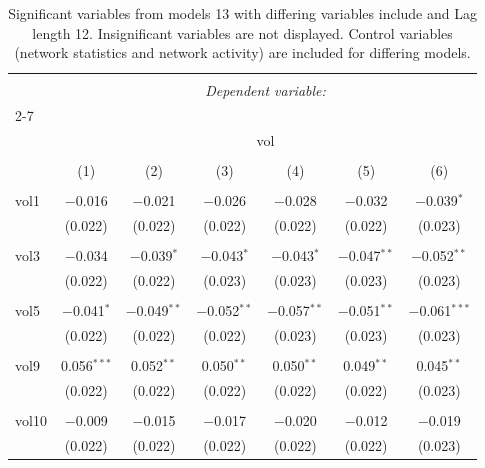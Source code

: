 
\begin{table}[!htbp] \centering 
  \caption{Significant variables from models 13 with differing variables include 
                               and Lag length 12. Insignificant variables are not displayed. 
                               Control variables (network statistics and network activity) are 
                               included for differing models.} 
  \label{Volumemodels1_5min_t} 
\scriptsize 
\begin{tabular}{@{\extracolsep{5pt}}lcccccc} 
\\[-1.8ex]\hline 
\hline \\[-1.8ex] 
 & \multicolumn{6}{c}{\textit{Dependent variable:}} \\ 
\cline{2-7} 
\\[-1.8ex] & \multicolumn{6}{c}{vol} \\ 
\\[-1.8ex] & (1) & (2) & (3) & (4) & (5) & (6)\\ 
\hline \\[-1.8ex] 
 vol1 & $-$0.016 & $-$0.021 & $-$0.026 & $-$0.028 & $-$0.032 & $-$0.039$^{*}$ \\ 
  & (0.022) & (0.022) & (0.022) & (0.022) & (0.022) & (0.023) \\ 
  & & & & & & \\ 
 vol3 & $-$0.034 & $-$0.039$^{*}$ & $-$0.043$^{*}$ & $-$0.043$^{*}$ & $-$0.047$^{**}$ & $-$0.052$^{**}$ \\ 
  & (0.022) & (0.022) & (0.023) & (0.023) & (0.023) & (0.023) \\ 
  & & & & & & \\ 
 vol5 & $-$0.041$^{*}$ & $-$0.049$^{**}$ & $-$0.052$^{**}$ & $-$0.057$^{**}$ & $-$0.051$^{**}$ & $-$0.061$^{***}$ \\ 
  & (0.022) & (0.022) & (0.022) & (0.023) & (0.023) & (0.023) \\ 
  & & & & & & \\ 
 vol9 & 0.056$^{***}$ & 0.052$^{**}$ & 0.050$^{**}$ & 0.050$^{**}$ & 0.049$^{**}$ & 0.045$^{**}$ \\ 
  & (0.022) & (0.022) & (0.022) & (0.022) & (0.022) & (0.023) \\ 
  & & & & & & \\ 
 vol10 & $-$0.009 & $-$0.015 & $-$0.017 & $-$0.020 & $-$0.012 & $-$0.019 \\ 
  & (0.022) & (0.022) & (0.022) & (0.022) & (0.022) & (0.023) \\ 

\end{tabular}
\end{table}
